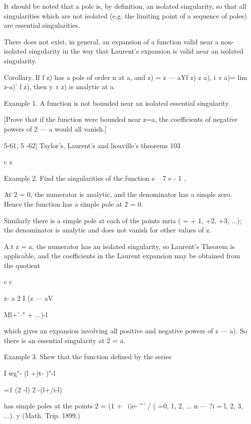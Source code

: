 {{{{It should be noted that a pole is, by definition, an isolated singularity, so 
that all singularities which are not isolated (e.g. the limiting point of a 
sequence of poles) are essential singularities. 

There does not exist, in general, an expansion of a function valid near a non-isolated 
singularity in the way that Laurent's expansion is valid near an isolated singularity. 

Corollary. If f z) has a pole of order n at a, and    z) =  z — aYf z)  z a), 
i\ r a)= lim  z-a)' f z), then y\ r z) is analytic at a. 

Example 1. A function is not bounded near an isolated essential singularity. 

[Prove that if the function were bounded near z=a, the coefficients of negative powers 
of 2 — a would all vanish.] 



5-61, 5 -62] Taylor's, Laurent's and liouville's theorems 103 

c z\  

Example 2. Find the singularities of the function e ~ 7 e  - 1 . 

At 2 = 0, the numerator is analytic, and the denominator has a simple zero. Hence 
the function has a simple pole at 2 = 0. 

Similarly there is a simple pole at each of the points  mria ( = + 1, +2, +3, ...); the 
denominator is analytic and does not vanish for other values of z. 

A.t z = a, the numerator has an isolated singularity, so Laurent's Theorem is applicable, 
and the coefficients in the Laurent expansion may be obtained from the quotient 

c c  

z- a 2 I (z — aV 



Ml+'--" + ...)-l 



which gives an expansion involving all positive and negative powers of  z — a). So there is 
an essential singularity at 2 = a. 

Example 3. Shew that the function defined by the series 

I wg"-  (l +)t- )"-l   

 =1 (2 -l) 2 -(l+/i-l)   

has simple poles at the points 2 = (1 +  ~i)e- ''' /  ( =0, 1, 2, ... n — \; ?i = l, 2, 3, ...). 
y (Math. Trip. 1899.) 

}}}}
